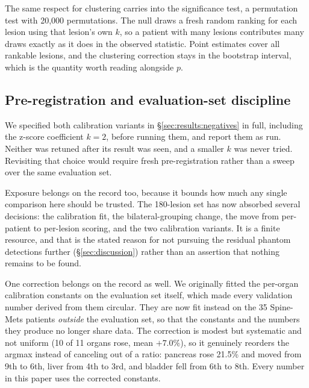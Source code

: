 The same respect for clustering carries into the significance test, a
permutation test with 20{,}000 permutations. The null draws a fresh random
ranking for each lesion using that lesion's own $k$, so a patient with many
lesions contributes many draws exactly as it does in the observed statistic.
Point estimates cover all rankable lesions, and the clustering correction stays
in the bootstrap interval, which is the quantity worth reading alongside
$p$.

\subsection{Pre-registration and evaluation-set discipline}
\label{sec:methods:prereg}

We specified both calibration variants in \S\ref{sec:results:negatives} in full,
including the z-score coefficient $k=2$, before running them, and report them
as run. Neither was retuned after its result was seen, and a smaller $k$ was
never tried. Revisiting that choice would require fresh pre-registration rather
than a sweep over the same evaluation set.

Exposure belongs on the record too, because it bounds how much any single
comparison here should be trusted. The 180-lesion set has now absorbed several
decisions: the calibration fit, the bilateral-grouping change, the move from
per-patient to per-lesion scoring, and the two calibration variants. It is a
finite resource, and that is the stated reason for not pursuing the residual
phantom detections further (\S\ref{sec:discussion}) rather than an assertion
that nothing remains to be found.

One correction belongs on the record as well. We originally fitted the per-organ
calibration constants on the evaluation set itself, which made every validation
number derived from them circular. They are now fit instead on the 35
Spine-Mets patients \emph{outside} the evaluation set, so that the constants and
the numbers they produce no longer share data. The correction is modest but
systematic and not uniform (10 of 11 organs rose, mean $+7.0\%$), so it
genuinely reorders the
argmax instead of canceling out of a ratio: pancreas rose 21.5\% and moved from
9th to 6th, liver from 4th to 3rd, and bladder fell from 6th to 8th. Every
number in this paper uses the corrected constants.
